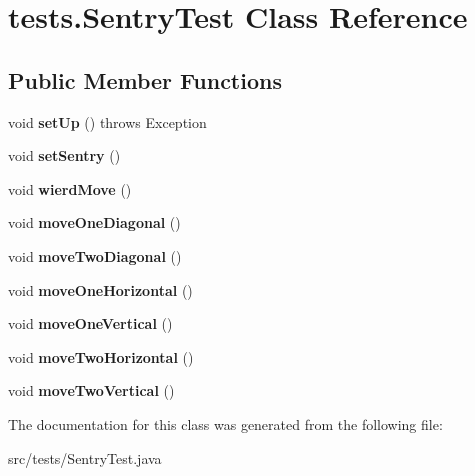 \hypertarget{classtests_1_1_sentry_test}{\section{tests.\-Sentry\-Test Class Reference}
\label{classtests_1_1_sentry_test}
}
\subsection*{Public Member Functions}
\begin{DoxyCompactItemize}
\item 
\hypertarget{classtests_1_1_sentry_test_a346ac0b6625ac921430016f054eaf6bd}{void {\bfseries set\-Up} ()  throws Exception }\label{classtests_1_1_sentry_test_a346ac0b6625ac921430016f054eaf6bd}

\item 
\hypertarget{classtests_1_1_sentry_test_a1ee0cfe7a78434ec7b0ae297e38265c8}{void {\bfseries set\-Sentry} ()}\label{classtests_1_1_sentry_test_a1ee0cfe7a78434ec7b0ae297e38265c8}

\item 
\hypertarget{classtests_1_1_sentry_test_a7565d39a18d4eba1be91e40714a64783}{void {\bfseries wierd\-Move} ()}\label{classtests_1_1_sentry_test_a7565d39a18d4eba1be91e40714a64783}

\item 
\hypertarget{classtests_1_1_sentry_test_a905987921d6adb2893eb85f481477e22}{void {\bfseries move\-One\-Diagonal} ()}\label{classtests_1_1_sentry_test_a905987921d6adb2893eb85f481477e22}

\item 
\hypertarget{classtests_1_1_sentry_test_ae1b67f425efd2cc09a186b1798b2ea1b}{void {\bfseries move\-Two\-Diagonal} ()}\label{classtests_1_1_sentry_test_ae1b67f425efd2cc09a186b1798b2ea1b}

\item 
\hypertarget{classtests_1_1_sentry_test_ac0f0f65933d4e3e466a97fc02172eb1d}{void {\bfseries move\-One\-Horizontal} ()}\label{classtests_1_1_sentry_test_ac0f0f65933d4e3e466a97fc02172eb1d}

\item 
\hypertarget{classtests_1_1_sentry_test_a02e1db2cbb3ada5e4af6892df520237e}{void {\bfseries move\-One\-Vertical} ()}\label{classtests_1_1_sentry_test_a02e1db2cbb3ada5e4af6892df520237e}

\item 
\hypertarget{classtests_1_1_sentry_test_acee078c5bb2903480a2dd28c64ae145d}{void {\bfseries move\-Two\-Horizontal} ()}\label{classtests_1_1_sentry_test_acee078c5bb2903480a2dd28c64ae145d}

\item 
\hypertarget{classtests_1_1_sentry_test_a706c98241cf1dc4cb68643c2519c8bae}{void {\bfseries move\-Two\-Vertical} ()}\label{classtests_1_1_sentry_test_a706c98241cf1dc4cb68643c2519c8bae}

\end{DoxyCompactItemize}


The documentation for this class was generated from the following file\-:\begin{DoxyCompactItemize}
\item 
src/tests/Sentry\-Test.\-java\end{DoxyCompactItemize}
